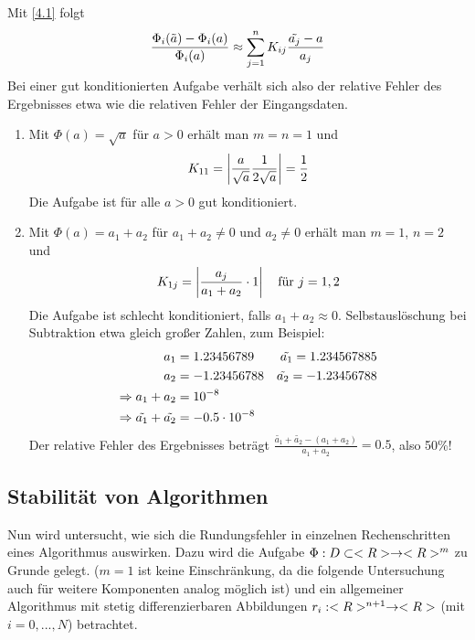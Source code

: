 Mit \cref{4.1} folgt
\begin{align}
	\frac{\Phi_i(\tilde{a}) - \Phi_i(a)}{\Phi_i(a)}\approx \sum_{j=1}^n K_{ij}\frac{\tilde{a_j}-a}{a_j}\notag
\end{align}
Bei einer gut konditionierten Aufgabe verhält sich also der relative Fehler des Ergebnisses etwa wie die relativen Fehler der Eingangsdaten.

\begin{example}
	\begin{enumerate}[label=(\alph*)]
		\item Mit $\Phi(a)=\sqrt{a}$ für $a>0$ erhält man $m=n=1$ und
		\begin{align}
			K_{11} = \left|\frac{a}{\sqrt{a}}\frac{1}{2\sqrt{a}}\right| = \frac{1}{2}\notag
		\end{align}
		Die Aufgabe ist für alle $a>0$ gut konditioniert.
		\item Mit $\Phi(a) = a_1+a_2$ für $a_1+a_2\neq 0$ und $a_2\neq 0$ erhält man $m=1$, $n=2$ und
		\begin{align}
			K_{1j} = \left|\frac{a_j}{a_1+a_2}\cdot 1\right|\quad\text{für } j=1,2\notag
		\end{align}
		Die Aufgabe ist schlecht konditioniert, falls $a_1+a_2\approx 0$. Selbstauslöschung bei Subtraktion etwa gleich großer Zahlen, zum Beispiel:
		\begin{align}
			a_1 &= 1.23456789 &\tilde{a_1} = 1.234567885 \notag \\
			a_2 &= -1.23456788 &\tilde{a_2} = -1.23456788 \notag \\
			\Rightarrow a_1+a_2 &= 10^{-8} \notag \\
			\Rightarrow \tilde{a_1} + \tilde{a_2} &= -0.5\cdot 10^{-8} \notag
		\end{align}
		Der relative Fehler des Ergebnisses beträgt $\frac{\tilde{a_1}+\tilde{a_2} - (a_1+a_2)}{a_1+a_2}=0.5$, also 50\%!
	\end{enumerate}
\end{example}

\subsection{Stabilität von Algorithmen}

Nun wird untersucht, wie sich die Rundungsfehler in einzelnen Rechenschritten eines Algorithmus auswirken. Dazu wird die Aufgabe $\Phi:D\subset<R>\to<R>^m$ zu Grunde gelegt. ($m=1$ ist keine Einschränkung, da die folgende Untersuchung auch für weitere Komponenten analog möglich ist) und ein allgemeiner Algorithmus mit stetig differenzierbaren Abbildungen $r_i:<R>^{n+1}\to<R>$ (mit $i=0,...,N$) betrachtet.

